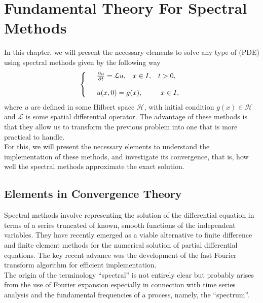 \chapter{Fundamental Theory For Spectral Methods}
\label{Chapter_2}
    
	\vspace{0.3cm}
	
	In this chapter, we will present the necessary elements to solve any type of (PDE) using spectral methods given by the following way
	\begin{align}
	\left \lbrace \begin{array}{ll}
		&\frac{\partial u}{\partial t} = \mathcal{L} u, \hspace{3mm} x \in I, \hspace{3mm} t > 0,\\
		\\
		&u(x, 0) = g(x), \hspace{9mm} x \in I, 
		\end{array}  \right .
	\end{align}
	where $u$ are defined in some Hilbert space $\mathcal{H}$, with initial condition $g(x) \in \mathcal{H}$ and $\mathcal{L}$ is some spatial differential operator. The advantage of these methods is that they allow us to transform the previous problem into one that is more practical to handle. \\
	
	For this, we will present the necessary elements to understand the implementation of these methods,
	and investigate its convergence, that is, how well the spectral methods approximate the exact solution. \\
    
    \section{Elements in Convergence Theory}
    
    Spectral methods involve representing the solution of the differential equation in terms of a series truncated of known, smooth functions of the independent variables. They have recently emerged as a viable alternative to finite difference and finite element methods for the numerical solution of partial differential equations. The key recent advance was the development of the fast Fourier transform algorithm for efficient implementation. \\
    
    The origin of the terminology “spectral” is not entirely clear but probably arises from the use of Fourier expansion especially in connection with time series analysis and the fundamental frequencies of a process, namely, the “spectrum”. \\
    
